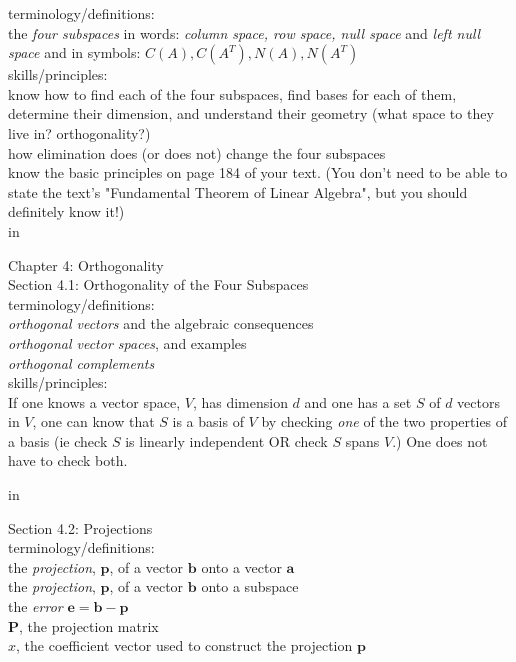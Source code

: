 \documentclass[11pt,fleqn]{article}
\newcommand{\ba}{\mathbf{a}}
\newcommand{\bb}{\mathbf{b}}
\newcommand{\be}{\mathbf{e}}
\newcommand{\bp}{\mathbf{p}}
\begin{document}
terminology/definitions: \\
the \emph{four subspaces} in words: \emph{column space, row space, null space} and \emph{left null space} and in symbols: $C(A), C(A^T), N(A), N(A^T)$\\


skills/principles: \\
know how to find each of the four subspaces, find bases for each of them, determine their dimension, and understand their geometry (what space to they live in? orthogonality?)\\
how elimination does (or does not) change the four subspaces\\
know the basic principles on page 184 of your text. (You don't need to be able to state the text's "Fundamental Theorem of Linear Algebra", but you should definitely know it!)\\

 in

\noindent Chapter 4: Orthogonality\\
\noindent Section 4.1: Orthogonality of the Four Subspaces \\

terminology/definitions: \\
\emph{orthogonal vectors} and the algebraic consequences\\
\emph{orthogonal vector spaces}, and examples\\
\emph{orthogonal complements} \\

skills/principles: \\
If one knows a vector space, $V$, has dimension $d$ and one has a set $S$ of $d$ vectors in $V$, one can know that $S$ is a basis of $V$ by checking \emph{one} of the two properties of a basis (ie check $S$ is linearly independent  OR check $S$ spans $V.$) One does not have to check both.


 in

\noindent Section 4.2: Projections \\


terminology/definitions: \\
the \emph{projection}, $\bp$, of a vector $\bb$ onto a vector $\ba$\\
the \emph{projection}, $\bp$, of a vector $\bb$ onto a subspace\\
the \emph{error} $\be=\bb-\bp$\\
$\mathbf{P}$, the projection matrix\\
$\widehat{x}$, the coefficient vector used to construct the projection $\bp$
\end{document}
